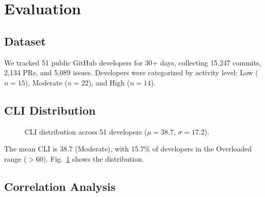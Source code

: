\documentclass[conference]{IEEEtran}
\begin{document}
\section{Evaluation}

\subsection{Dataset}

We tracked 51 public GitHub developers for 30+ days, collecting 15,247 commits, 2,134 PRs, and 5,089 issues. Developers were categorized by activity level: Low ($n=15$), Moderate ($n=22$), and High ($n=14$).

\subsection{CLI Distribution}

\begin{figure}[t]
\centering
{}
\caption{CLI distribution across 51 developers ($\mu = 38.7$, $\sigma = 17.2$).}
\label{fig:clidist}
\end{figure}

The mean CLI is 38.7 (Moderate), with 15.7\% of developers in the Overloaded range ($>60$). Fig.~\ref{fig:clidist} shows the distribution.

\subsection{Correlation Analysis}
\end{document}
